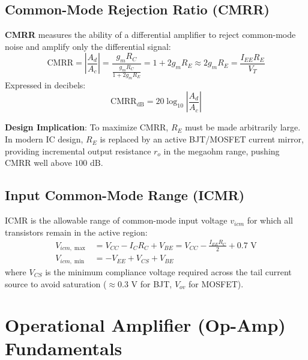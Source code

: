 \documentclass[12pt,a4paper]{article}
\begin{document}
\subsection{Common-Mode Rejection Ratio (CMRR)}
\begin{tcolorbox}[defbox, title={Common Mode Rejection Ratio}]
\textbf{CMRR} measures the ability of a differential amplifier to reject common-mode noise and amplify only the differential signal:
\begin{equation}
  \text{CMRR} = \left|\frac{A_d}{A_c}\right| = \frac{g_m R_C}{\frac{g_m R_C}{1 + 2g_m R_E}} = 1 + 2g_m R_E \approx 2 g_m R_E = \frac{I_{EE} R_E}{V_T}
\end{equation}
Expressed in decibels:
\begin{equation}
  \text{CMRR}_{\text{dB}} = 20 \log_{10}\left|\frac{A_d}{A_c}\right|
\end{equation}
\end{tcolorbox}
\textbf{Design Implication}: To maximize CMRR, $R_E$ must be made arbitrarily large. In modern IC design, $R_E$ is replaced by an active BJT/MOSFET current mirror, providing incremental output resistance $r_o$ in the megaohm range, pushing CMRR well above $100\text{ dB}$.

\subsection{Input Common-Mode Range (ICMR)}
\begin{tcolorbox}[formulabox, title={Input Common-Mode Range Boundaries}]
$\text{ICMR}$ is the allowable range of common-mode input voltage $v_{icm}$ for which all transistors remain in the active region:
\begin{align}
  V_{icm,\max} &= V_{CC} - I_C R_C + V_{BE} = V_{CC} - \frac{I_{EE} R_C}{2} + 0.7\text{ V} \\
  V_{icm,\min} &= -V_{EE} + V_{CS} + V_{BE}
\end{align}
where $V_{CS}$ is the minimum compliance voltage required across the tail current source to avoid saturation ($\approx 0.3\text{ V}$ for BJT, $V_{ov}$ for MOSFET).
\end{tcolorbox}

\section{Operational Amplifier (Op-Amp) Fundamentals}
\end{document}
